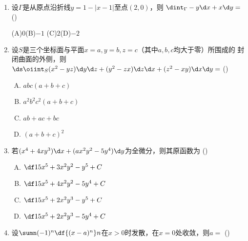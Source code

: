 \begin{enumerate}
  (A)$C_1r+C_2$\hspace{1cm}(B)$C_1/r+C_2$\hspace{1cm}
  (C)$C_1r^2+C_2$\hspace{1cm}(D)$C_1/r^2+C_2$
  以上$C_1,C_2$为任意常数
  \item 设$\Gamma$是从原点沿折线$y=1-|x-1|$至点$(2,0)$，则
  $\dint_{\Gamma}-y\d x+x\d y=$
  (\underline{\hspace{1cm}})
  
  (A)$0$\hspace{1cm}(B)$-1$\hspace{1cm}
  (C)$2$\hspace{1cm}(D)$-2$
  \item 设$S$是三个坐标面与平面$x=a,y=b,z=c$（其中$a,b,c$均大于零）所围成的
  封闭曲面的外侧，则$\ds\oiint_S(x^2-yz)\d y\d z+(y^2-zx)\d z\d x
  +(z^2-xy)\d x\d y=$
  (\underline{\hspace{1cm}})
  \begin{enumerate}[(A)]
    \item $abc(a+b+c)$
    \item $a^2b^2c^2(a+b+c)$
    \item $ab+ac+bc$
    \item $(a+b+c)^2$
  \end{enumerate}
  \item 若$(x^4+4xy^3)\d x+(ax^2y^2-5y^4)\d y$为全微分，则其原函数为
  (\underline{\hspace{1cm}})
  \begin{enumerate}[(A)]
    \item $\df15x^5+3x^2y^2-y^5+C$
    \item $\df15x^5+4x^2y^2-5y^4+C$
    \item $\df15x^5+2x^2y^3-y^5+C$
    \item $\df15x^5+2x^2y^3-5y^4+C$
  \end{enumerate}
  \item 设$\sumn(-1)^n\df{(x-a)^n}n$在$x>0$时发散，在$x=0$处收敛，则$a=$
  (\underline{\hspace{1cm}})
  

\end{enumerate}
